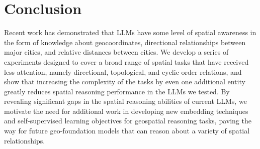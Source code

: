 \section{Conclusion}
\label{section:conclusion}
\normalsize


Recent work has demonstrated that LLMs have some level of spatial awareness in the form of knowledge about geocoordinates, directional relationships between major cities, and relative distances between cities.
We develop a series of experiments designed to cover a broad range of spatial tasks that have received less attention, namely directional, topological, and cyclic order relations, and show that increasing the complexity of the tasks by even one additional entity greatly reduces spatial reasoning performance in the LLMs we tested.
By revealing significant gaps in the spatial reasoning abilities of current LLMs, we motivate the need for additional work in developing new embedding techniques and self-supervised learning objectives for geospatial reasoning tasks, paving the way for future geo-foundation models that can reason about a variety of spatial relationships.



%
%
%
%
